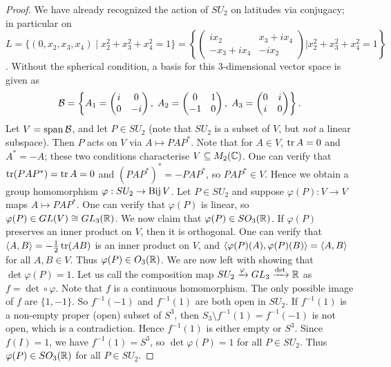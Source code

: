 \begin{proof}
    We have already recognized the action of $SU_{2}$ on latitudes via conjugacy; in particular on $L = \{(0,x_{2},x_{3},x_{4}) \mid x_{2}^{2} + x_{3}^{2} + x_{4}^{2} = 1\} = \left\{ \begin{pmatrix}
        ix_{2} & x_{3} + ix_{4} \\ -x_{3} + ix_{4} & -ix_{2}
    \end{pmatrix} \Big| x_{2}^{2} + x_{3}^{2} + x_{4}^{2} = 1 \right\}$. Without the spherical condition, a basis for this 3-dimensional vector space is given as
    \begin{align}
        \mathcal{B} = \left\{ A_{1} = \begin{pmatrix}
            i & 0 \\ 0 & -i
        \end{pmatrix},\; A_{2} = \begin{pmatrix}
            0 & 1 \\ -1 & 0
        \end{pmatrix},\; A_{3} = \begin{pmatrix}
            0 & i \\ i & 0
        \end{pmatrix} \right\}.
    \end{align}
    Let $V = \operatorname{span} \mathcal{B}$, and let $P \in SU_{2}$ (note that $SU_{2}$ is a subset of $V$, but \textit{not} a linear subspace). Then $P$ acts on $V$ via $A \mapsto PAP^{\ast}$. Note that for $A \in V$, $\operatorname{tr} A = 0$ and $A^{\ast} = -A$; these two conditions characterise $V \subseteq M_{2}(\mathbb{C})$. One can verify that $\operatorname{tr} (PAP^{\ast}) = \operatorname{tr} A = 0$ and $(PAP^{\ast})^{\ast} = -PAP^{\ast}$, so $PAP^{\ast} \in V$. Hence we obtain a group homomorphism $\varphi : SU_{2} \to \operatorname{Bij} V$. Let $P \in SU_{2}$ and suppose $\varphi(P):V \to V$ maps $A \mapsto PAP^{\ast}$. One can verify that $\varphi(P)$ is linear, so $\varphi(P) \in GL(V) \cong GL_{3}(\mathbb{R})$. We now claim that $\varphi(P) \in SO_{3}(\mathbb{R})$. If $\varphi(P)$ preserves an inner product on $V$, then it is orthogonal. One can verify that $\langle A,B\rangle = -\frac{1}{2}\operatorname{tr}(AB)$ is an inner product on $V$, and $\langle\varphi(P)(A),\varphi(P)(B)\rangle = \langle A,B\rangle$ for all $A,B \in V$. Thus $\varphi(P) \in O_{3}(\mathbb{R})$. We are now left with showing that $\det \varphi(P) = 1$. Let us call the composition map $SU_{2} \xrightarrow{\varphi} GL_{3} \xrightarrow{\det} \mathbb{R}$ as $f = \det \circ \varphi$. Note that $f$ is a continuous homomorphism. The only possible image of $f$ are $\{1,-1\}$. So $f^{-1}(-1)$ and $f^{-1}(1)$ are both open in $SU_{2}$. If $f^{-1}(1)$ is a non-empty proper (open) subset of $S^{3}$, then $S_{3}\setminus f^{-1}(1) = f^{-1}(-1)$ is not open, which is a contradiction. Hence $f^{-1}(1)$ is either empty or $S^{3}$. Since $f(I) = 1$, we have $f^{-1}(1) = S^{3}$, so $\det \varphi(P) = 1$ for all $P \in SU_{2}$. Thus $\varphi(P) \in SO_{3}(\mathbb{R})$ for all $P \in SU_{2}$.
\end{proof}